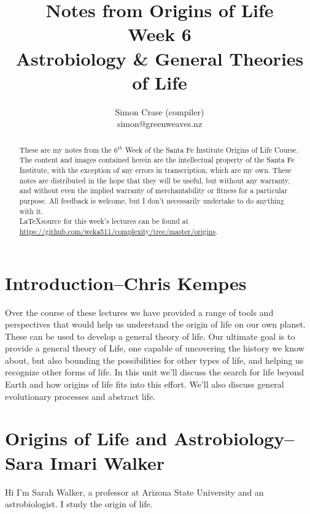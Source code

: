 \documentclass[]{article}
\title{
	Notes from Origins of Life\\
	Week 6\\
	 Astrobiology \& General Theories of Life
}
\author{Simon Crase (compiler)\\simon@greenweaves.nz}
\begin{document}
\maketitle

\begin{abstract}
   These are my notes from the $6^{th}$ Week of the Santa Fe Institute Origins of Life Course\cite{sfi2020}. 
   The content and images contained herein are the intellectual property of the Santa Fe Institute, with the exception of any errors in transcription, which are my own.
   These notes are distributed in the hope that they will be useful,
   but without any warranty, and without even the implied warranty of
   merchantability or fitness for a particular purpose. All feedback is welcome,
   but I don't necessarily undertake to do anything with it.\\
   \LaTeX source for this week's lectures can be found at\\
   \url{https://github.com/weka511/complexity/tree/master/origins}.
\end{abstract}

\setcounter{tocdepth}{2}
\tableofcontents

\listoffigures

\section[Introduction]{Introduction--Chris Kempes}

Over the course of these lectures we have provided a range of tools and perspectives that would help us understand the origin of life on our own planet. These can be used to develop a general theory of life. Our ultimate goal is to provide a general theory of Life, one capable of uncovering the history we know about, but also bounding the possibilities for other types of life, and helping us recognize other forms of life. In this unit we'll discuss the search for life beyond Earth and how origins of life fits into this effort. We'll also discuss general evolutionary processes and abstract life. 

\section[Origins of Life and Astrobiology]{Origins of Life and Astrobiology-- Sara Imari Walker}

Hi I'm Sarah Walker, a professor at Arizona State University and an astrobiologist.
I study the origin of life.
\end{document}

